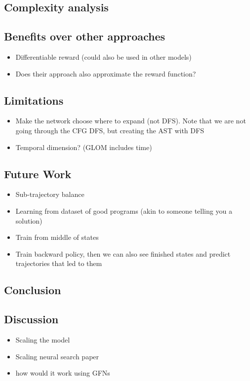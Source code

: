 \subsection{Complexity analysis}

\subsection{Benefits over other approaches}
\begin{itemize}
    \item Differentiable reward (could also be used in other models)
    \item Does their approach also approximate the reward function?
\end{itemize}

\subsection{Limitations}
\begin{itemize}
    \item Make the network choose where to expand (not DFS). Note that we are not going through the CFG DFS, but creating the AST with DFS
    \item Temporal dimension? (GLOM includes time)
\end{itemize}

\subsection{Future Work}
\begin{itemize}
    \item Sub-trajectory balance
    \item Learning from dataset of good programs (akin to someone telling you a solution)
    \item Train from middle of states
    \item Train backward policy, then we can also see finished states and predict trajectories that led to them
    
\end{itemize}

\subsection{Conclusion}

\subsection{Discussion}
\begin{itemize}
    \item Scaling the model 
    \item Scaling neural search paper
    \item how would it work using GFNs
\end{itemize}

